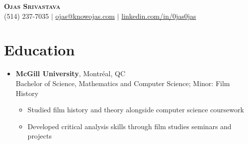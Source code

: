 \documentclass[letterpaper,11pt]{article}
\begin{document}
\begin{center}
    \textbf{\Huge \scshape Ojas Srivastava} \\ \vspace{2pt}
    \small (514) 237-7035 $|$ \href{mailto:ojas@knowojas.com}{ojas@knowojas.com} $|$ 
    \href{https://linkedin.com/in/0jas0jas}{linkedin.com/in/0jas0jas}
\end{center}

\section{Education}
\begin{itemize}[leftmargin=0.15in, label={}]
  \item \textbf{McGill University}, Montréal, QC \\
    Bachelor of Science, Mathematics and Computer Science; Minor: Film History \\
    \vspace{-6pt}
    \begin{itemize}
      \item Studied film history and theory alongside computer science coursework
      \item Developed critical analysis skills through film studies seminars and projects
    \end{itemize}
\end{itemize}

\end{document}

